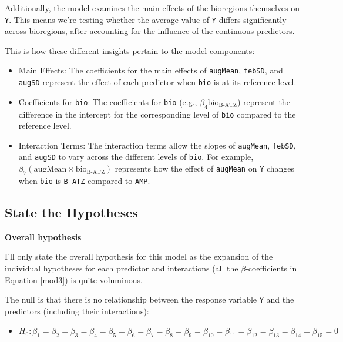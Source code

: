 \documentclass[
  letterpaper,
]{book}
\providecommand{\tightlist}{%
  \setlength{\itemsep}{0pt}\setlength{\parskip}{0pt}}\usepackage{longtable,booktabs,array}
\begin{document}
Additionally, the model examines the main effects of the bioregions
themselves on \texttt{Y}. This means we're testing whether the average
value of \texttt{Y} differs significantly across bioregions, after
accounting for the influence of the continuous predictors.

This is how these different insights pertain to the model components:

\begin{itemize}
\tightlist
\item
  Main Effects: The coefficients for the main effects of
  \texttt{augMean}, \texttt{febSD}, and \texttt{augSD} represent the
  effect of each predictor when \texttt{bio} is at its reference level.
\item
  Coefficients for \texttt{bio}: The coefficients for \texttt{bio}
  (e.g., \(\beta_4 \text{bio}_{\text{B-ATZ}}\)) represent the difference
  in the intercept for the corresponding level of \texttt{bio} compared
  to the reference level.
\item
  Interaction Terms: The interaction terms allow the slopes of
  \texttt{augMean}, \texttt{febSD}, and \texttt{augSD} to vary across
  the different levels of \texttt{bio}. For example,
  \(\beta_7 (\text{augMean} \times \text{bio}_{\text{B-ATZ}})\)
  represents how the effect of \texttt{augMean} on \texttt{Y} changes
  when \texttt{bio} is \texttt{B-ATZ} compared to \texttt{AMP}.
\end{itemize}

\subsection{State the Hypotheses}\label{state-the-hypotheses}

\textbf{Overall hypothesis}

I'll only state the overall hypothesis for this model as the expansion
of the individual hypotheses for each predictor and interactions (all
the \(\beta\)-coefficients in Equation \ref{mod3}) is quite voluminous.

The null is that there is no relationship between the response variable
\texttt{Y} and the predictors (including their interactions):

\begin{itemize}
\tightlist
\item
  \(H_0: \beta_1 = \beta_2 = \beta_3 = \beta_4 = \beta_5 = \beta_6 = \beta_7 = \beta_8 = \beta_9 = \beta_{10} = \beta_{11} = \beta_{12} = \beta_{13} = \beta_{14} = \beta_{15} = 0\)
\end{itemize}
\end{document}

